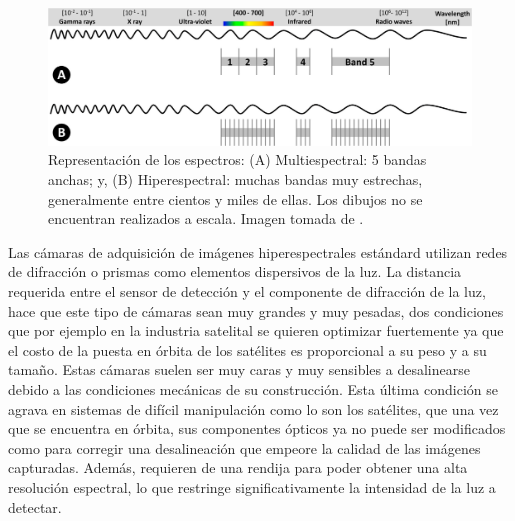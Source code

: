 \documentclass{ctuthesis}
\begin{document}
\begin{figure}[H]
	\centering
	\includegraphics[scale=0.2]{Figs/plan_de_tesis/multivshyper.png}
	\caption{ Representación de los espectros: (A) Multiespectral: 5 
		bandas anchas; y, (B) Hiperespectral: muchas bandas muy estrechas, 
		generalmente entre cientos y miles de ellas. Los dibujos no se 
		encuentran 
		realizados a escala. Imagen tomada de \cite{Adao2017}.}
	\label{fig:spectrus}
\end{figure}


Las cámaras de adquisición de imágenes hiperespectrales estándard utilizan 
redes de difracción o prismas como elementos dispersivos de la luz. La 
distancia requerida entre el sensor de detección y  el componente de difracción 
de la luz, hace que este tipo de cámaras sean muy grandes y muy pesadas, dos 
condiciones que por ejemplo en la industria satelital se quieren optimizar 
fuertemente ya que el costo de la puesta en órbita de los satélites es 
proporcional a su peso y a su tamaño. Estas cámaras suelen ser muy caras y muy 
sensibles a desalinearse debido a las condiciones mecánicas de su construcción. 
Esta última condición se agrava en sistemas de difícil manipulación como lo son 
los satélites, que una vez que se encuentra en órbita, sus componentes ópticos 
ya no puede ser modificados como para corregir una desalineación que empeore la 
calidad de las imágenes capturadas. Además, requieren de una rendija 
para poder obtener una alta resolución espectral, lo que restringe 
significativamente la intensidad de la luz a detectar.
\end{document}
